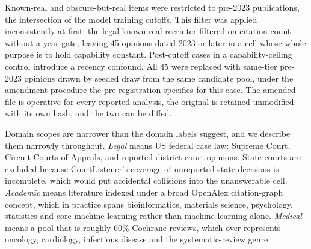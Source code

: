 Known-real and obscure-but-real items were restricted to pre-2023 publications,
the intersection of the model training cutoffs. This filter was applied
inconsistently at first: the legal known-real recruiter filtered on citation
count without a year gate, leaving 45 opinions dated 2023 or later in a cell
whose whole purpose is to hold capability constant. Post-cutoff cases in a
capability-ceiling control introduce a recency confound. All 45 were replaced
with same-tier pre-2023 opinions drawn by seeded draw from the same candidate
pool, under the amendment procedure the pre-registration specifies for this
case. The amended file is operative for every reported analysis, the original is
retained unmodified with its own hash, and the two can be diffed.

Domain scopes are narrower than the domain labels suggest, and we describe them
narrowly throughout. \emph{Legal} means US federal case law: Supreme Court,
Circuit Courts of Appeals, and reported district-court opinions. State courts
are excluded because CourtListener's coverage of unreported state decisions is
incomplete, which would put accidental collisions into the unanswerable cell.
\emph{Academic} means literature indexed under a broad OpenAlex citation-graph
concept, which in practice spans bioinformatics, materials science, psychology,
statistics and core machine learning rather than machine learning alone.
\emph{Medical} means a pool that is roughly 60\% Cochrane reviews, which
over-represents oncology, cardiology, infectious disease and the
systematic-review genre.

